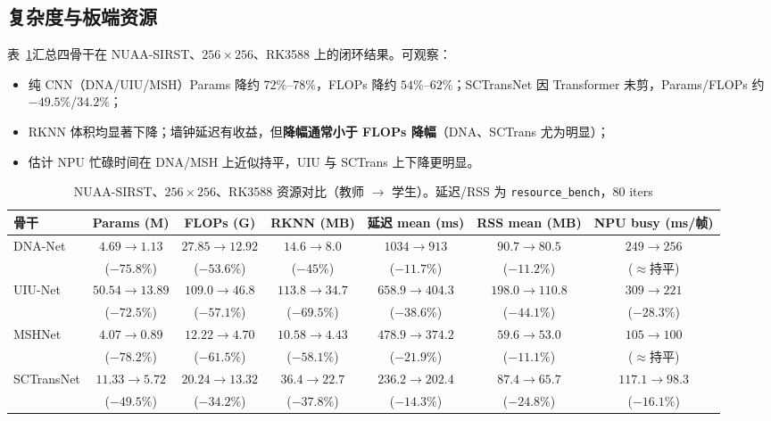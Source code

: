 \documentclass[lettersize,journal]{IEEEtran}
\begin{document}
\subsection{复杂度与板端资源}
\label{sec:edge}

表~\ref{tab:resource}汇总四骨干在 NUAA-SIRST、$256\times256$、RK3588 上的闭环结果。可观察：
\begin{itemize}
\item 纯 CNN（DNA/UIU/MSH）Params 降约 $72\%$--$78\%$，FLOPs 降约 $54\%$--$62\%$；SCTransNet 因 Transformer 未剪，Params/FLOPs 约 $-49.5\%$/$34.2\%$；
\item RKNN 体积均显著下降；墙钟延迟有收益，但\textbf{降幅通常小于 FLOPs 降幅}（DNA、SCTrans 尤为明显）；
\item 估计 NPU 忙碌时间在 DNA/MSH 上近似持平，UIU 与 SCTrans 上下降更明显。
\end{itemize}

\begin{table}[!t]
\renewcommand{\arraystretch}{1.12}
\caption{NUAA-SIRST、$256\times256$、RK3588 资源对比（教师 $\rightarrow$ 学生）。延迟/RSS 为 \texttt{resource\_bench}，$80$ iters}
\label{tab:resource}
\centering
\begin{tabular}{@{}lcccccc@{}}
\toprule
骨干 & Params (M) & FLOPs (G) & RKNN (MB) & 延迟 mean (ms) & RSS mean (MB) & NPU busy (ms/帧) \\
\midrule
DNA-Net & $4.69\!\rightarrow\!1.13$ & $27.85\!\rightarrow\!12.92$ & $14.6\!\rightarrow\!8.0$ & $1034\!\rightarrow\!913$ & $90.7\!\rightarrow\!80.5$ & $249\!\rightarrow\!256$ \\
 & (\textbf{$-75.8\%$}) & (\textbf{$-53.6\%$}) & ($-45\%$) & (\textbf{$-11.7\%$}) & ($-11.2\%$) & ($\approx$持平) \\
\midrule
UIU-Net & $50.54\!\rightarrow\!13.89$ & $109.0\!\rightarrow\!46.8$ & $113.8\!\rightarrow\!34.7$ & $658.9\!\rightarrow\!404.3$ & $198.0\!\rightarrow\!110.8$ & $309\!\rightarrow\!221$ \\
 & (\textbf{$-72.5\%$}) & (\textbf{$-57.1\%$}) & (\textbf{$-69.5\%$}) & (\textbf{$-38.6\%$}) & (\textbf{$-44.1\%$}) & (\textbf{$-28.3\%$}) \\
\midrule
MSHNet & $4.07\!\rightarrow\!0.89$ & $12.22\!\rightarrow\!4.70$ & $10.58\!\rightarrow\!4.43$ & $478.9\!\rightarrow\!374.2$ & $59.6\!\rightarrow\!53.0$ & $105\!\rightarrow\!100$ \\
 & (\textbf{$-78.2\%$}) & (\textbf{$-61.5\%$}) & (\textbf{$-58.1\%$}) & (\textbf{$-21.9\%$}) & ($-11.1\%$) & ($\approx$持平) \\
\midrule
SCTransNet & $11.33\!\rightarrow\!5.72$ & $20.24\!\rightarrow\!13.32$ & $36.4\!\rightarrow\!22.7$ & $236.2\!\rightarrow\!202.4$ & $87.4\!\rightarrow\!65.7$ & $117.1\!\rightarrow\!98.3$ \\
 & (\textbf{$-49.5\%$}) & (\textbf{$-34.2\%$}) & (\textbf{$-37.8\%$}) & (\textbf{$-14.3\%$}) & (\textbf{$-24.8\%$}) & (\textbf{$-16.1\%$}) \\
\bottomrule
\end{tabular}
\end{table}
\end{document}
